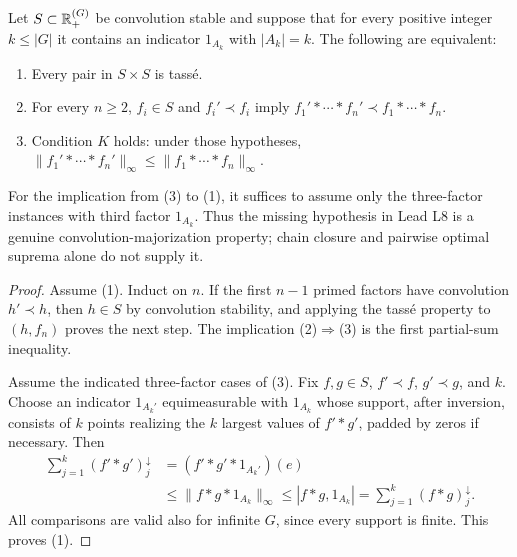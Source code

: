 \begin{theorem}\label{C-K-replacement}
Let $S\subset{\ensuremath{\mathbb{R}}}^{(G)}_+$ be convolution stable and suppose that for every
positive integer $k\leq|G|$ it contains an indicator $1_{A_k}$ with
$|A_k|=k$. The following are equivalent:
\begin{enumerate}
\item Every pair in $S\times S$ is tass\'e.
\item For every $n\geq2$, $f_i\in S$ and $f_i'\prec f_i$ imply
      $f_1'*\cdots*f_n'\prec f_1*\cdots*f_n$.
\item Condition $K$ holds: under those hypotheses,
      $\|f_1'*\cdots*f_n'\|_\infty
          \leq\|f_1*\cdots*f_n\|_\infty$.
\end{enumerate}
For the implication from (3) to (1), it suffices to assume only the
three-factor instances with third factor $1_{A_k}$. Thus the missing
hypothesis in Lead L8 is a genuine convolution-majorization property;
chain closure and pairwise optimal suprema alone do not supply it.
\end{theorem}
\begin{proof}
Assume (1). Induct on $n$. If the first $n-1$ primed factors have
convolution $h'\prec h$, then $h\in S$ by convolution stability, and
applying the tass\'e property to $(h,f_n)$ proves the next step.
The implication (2)$\Rightarrow$(3) is the first partial-sum inequality.

Assume the indicated three-factor cases of (3). Fix $f,g\in S$,
$f'\prec f$, $g'\prec g$, and $k$. Choose an indicator $1_{A_k'}$
equimeasurable with $1_{A_k}$ whose support, after inversion, consists of
$k$ points realizing the $k$ largest values of $f'*g'$, padded by zeros if
necessary. Then
\[
 \begin{split}
 \sum_{j=1}^k(f'*g')^\downarrow_j
 &=(f'*g'*1_{A_k'})(e)\\
 &\leq\|f*g*1_{A_k}\|_\infty
 \leq |f*g,1_{A_k}|
 =\sum_{j=1}^k(f*g)^\downarrow_j.
 \end{split}
\]
All comparisons are valid also for infinite $G$, since every support is
finite. This proves (1).
\end{proof}


